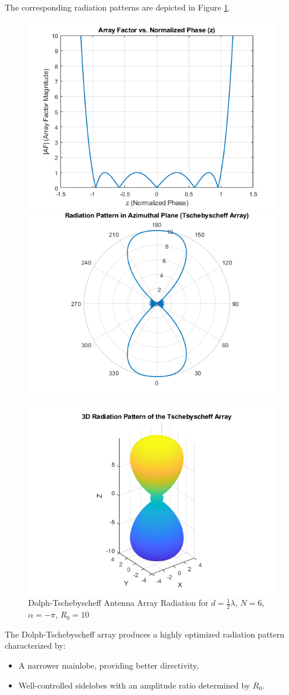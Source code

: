 \documentclass[a4paper, 12pt, english]{article}
\begin{document}
The corresponding radiation patterns are depicted in Figure \ref{fig:dolph_tshebyscheff 1}.
\begin{figure}[H]
    \centering
         \includegraphics[width=0.49\linewidth]{report/images/dolph_tshebyscheff_2D.png}
         \hfill
         \includegraphics[width=0.49\linewidth]{report/images/dolph_tshebyscheff_rad_2D.png}
         \hfill

         \includegraphics[width=0.49\linewidth]{report/images/dolph_tshebyscheff_3D.png}
         \caption{Dolph-Tschebyscheff Antenna Array Radiation for $ {d} = {\frac{1}{2}}{\lambda} $, $ {N} = {6} $, $ {\alpha} = -{\pi} $, $ {{R}_{0}} = {10} $}
         \label{fig:dolph_tshebyscheff 1}
\end{figure}
The Dolph-Tschebyscheff array produces a highly optimized radiation pattern characterized by:
\begin{itemize}
    \item A narrower mainlobe, providing better directivity,
    \item Well-controlled sidelobes with an amplitude ratio determined by $ {{R}_{0}} $.
\end{itemize}
\end{document}
